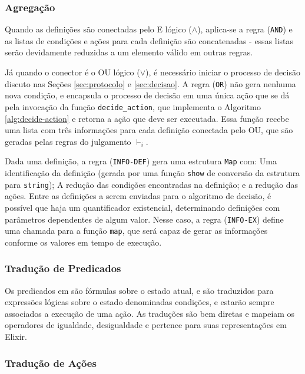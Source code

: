 \subsubsection{Agregação}


Quando as definições são conectadas pelo E lógico ($\land$), aplica-se a regra
(\texttt{AND}) e as listas de
condições e ações para cada definição são concatenadas - essas listas serão
devidamente reduzidas a um elemento válido em outras regras.

Já quando o conector é o OU lógico ($\lor$), é necessário iniciar o processo de decisão
discuto nas Seções \ref{sec:protocolo} e \ref{sec:decisao}. A regra
(\texttt{OR}) não gera nenhuma nova condição, e encapsula o processo de decisão
em uma única ação que se dá pela invocação da função \texttt{decide\_action},
que implementa o Algoritmo \ref{alg:decide-action} e retorna a ação que deve ser
executada. Essa função recebe uma lista com três informações para cada definição conectada
pelo OU, que são geradas pelas regras do julgamento $\vdash_i$.

Dada uma definição, a regra (\texttt{INFO-DEF}) gera uma estrutura \texttt{Map}
com: Uma identificação da definição (gerada por uma função \texttt{show} de
conversão da estrutura para \texttt{string}); A redução das condições
encontradas na definição; e a redução das ações. Entre as definições a serem
enviadas para o algoritmo de decisão, é possível que haja um quantificador
existencial, determinando definições com parâmetros dependentes
de algum valor. Nesse caso, a regra (\texttt{INFO-EX}) define uma chamada para a
função \texttt{map}, que será capaz de gerar as informações conforme os valores
em tempo de execução.


\subsubsection{Tradução de Predicados}

Os predicados em \TLA são fórmulas sobre o estado atual, e são traduzidos para
expressões lógicas sobre o estado denominadas condições, e estarão sempre
associados a execução de uma ação. As traduções são bem diretas e mapeiam os
operadores de igualdade, desigualdade e pertence para suas representações em
Elixir.



\subsubsection{Tradução de Ações}

